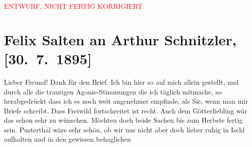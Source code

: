 
\begin{center}
            \textcolor{red}{ENTWURF, NICHT FERTIG KORRIGIERT}
                      \end{center}
            
         
         \renewcommand{\erwaehntePersonen}{Personen: Paul Goldmann, Elisabeth Kotter}
         \renewcommand{\erwaehnteOrte}{Orte: Bad Ischl, Heringsdorf, Pustertal, Rügen, Wien}
         \renewcommand{\erwaehnteWerke}{Werke: Der Tod Georgs, Die Münchener Kunstausstellungen. I. Im königl. Glaspalast, Die Münchener Kunstausstellungen. II. Im königl. Glaspalast, Freiwild. Schauspiel in 3 Akten, Münchener Brief. (Orig.-Corr. der »Wiener Allg. Ztg.«), Wiener Allgemeine Zeitung}
               \section[Felix Salten an Arthur Schnitzler, {[}30. 7. 1895{]}]{ Felix Salten an Arthur Schnitzler, {[}30. 7. 1895{]}}\nopagebreak{}\rehead{ }\begin{ledgroupsized}[t]{13cm}\normalsize\beginnumbering \toendnotes[C]{\smallbreak\pagebreak[2]} 
\toendnotes[C]{\smallbreak}\pstart
           \noindent{}{\pb}Lieber Freund! Dank für den Brief. Ich bin hier so auf mich allein
               gestellt, und durch alle die traurigen Agonie-Stimmungen die ich täglich mitmache, so
               herabgedrückt dass ich es noch weit angenehmer empfinde, als Sie, wenn man mir {\pb}Briefe schreibt. Dass Freiwild fortschreitet ist recht. Auch dem Götterliebling wär das schon sehr zu wünschen.
               Möchten doch beide Sachen bis zum Herbste fertig sein. Pusterthal wäre sehr schön, ob wir uns nicht aber doch lieber ruhig in Ischl aufhalten und in den gewissen behaglichen

\end{ledgroupsized}
